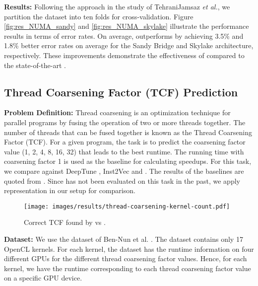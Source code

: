 \textbf{Results:} Following the approach in the study of TehraniJamsaz \textit{et al.}, we partition the dataset into ten folds for cross-validation. Figure \ref{fig:res_NUMA_sandy} and \ref{fig:res_NUMA_skylake} illustrate the performance results in terms of error rates. On average, \ourtool outperforms \programl by achieving 3.5\% and 1.8\% better error rates on average for the Sandy Bridge and Skylake architecture, respectively. These improvements demonstrate the effectiveness of \ourtool compared to the state-of-the-art \programl.
\vspace{-8pt}

\subsection{Thread Coarsening Factor (TCF) Prediction}
\textbf{Problem Definition:} Thread coarsening is an optimization technique for parallel programs by fusing the operation of two or more threads together. The number of threads that can be fused together is known as the Thread Coarsening Factor (TCF). For a given program, the task is to predict the coarsening factor value (1, 2, 4, 8, 16, 32) that leads to the best runtime. The running time with coarsening factor 1 is used as the baseline for calculating speedups.
For this task, we compare \ourtool against DeepTune \cite{cummins2017end}, Inst2Vec \cite{ben2018neural} and \programl \cite{cummins2020programl}. The results of the baselines are quoted from \cite{ben2018neural}. Since \programl has not been evaluated on this task in the past, we apply \programl representation in our setup for comparison.
\begin{wrapfigure}{r}{0.5\textwidth}
\vspace{-20pt}
  \begin{center}
\texttt{[image: images/results/thread-coarsening-kernel-count.pdf]}
\vspace{-12pt}
\captionsetup{justification=centering}
\caption{Correct TCF found by \programl vs .}
\label{figs:thread-coarsening-kernel-count}
  \end{center}
\vspace{-10pt}
\end{wrapfigure}
\textbf{Dataset:} We use the dataset of Ben-Nun et al. \cite{cummins2017end}. The dataset contains only 17 OpenCL kernels. For each kernel, the dataset has the runtime information on four different GPUs for the different thread coarsening factor values. Hence, for each kernel, we have the runtime corresponding to each thread coarsening factor value on a specific GPU device.

